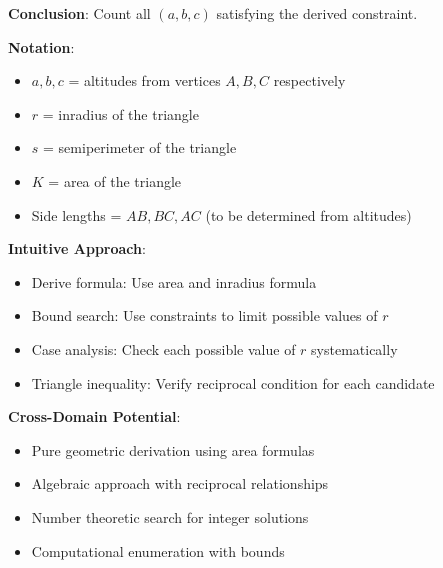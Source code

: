 \documentclass[12pt]{article}
\begin{document}
\begin{problemconfigbox}
\textbf{Conclusion}: Count all $(a, b, c)$ satisfying the derived constraint.

\textbf{Notation}:
\begin{itemize}
    \item $a, b, c$ = altitudes from vertices $A, B, C$ respectively
    \item $r$ = inradius of the triangle
    \item $s$ = semiperimeter of the triangle
    \item $K$ = area of the triangle
    \item Side lengths = $AB, BC, AC$ (to be determined from altitudes)
\end{itemize}

\textbf{Intuitive Approach}:
\begin{itemize}
    \item Derive formula: Use area and inradius formula
    \item Bound search: Use constraints to limit possible values of $r$
    \item Case analysis: Check each possible value of $r$ systematically
    \item Triangle inequality: Verify reciprocal condition for each candidate
\end{itemize}

\textbf{Cross-Domain Potential}:
\begin{itemize}
    \item Pure geometric derivation using area formulas
    \item Algebraic approach with reciprocal relationships
    \item Number theoretic search for integer solutions
    \item Computational enumeration with bounds
\end{itemize}

\end{problemconfigbox}
\end{document}
